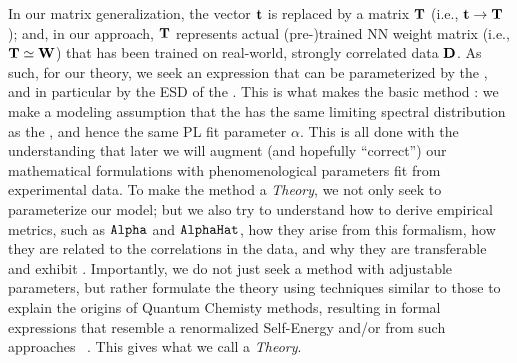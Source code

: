 In our matrix generalization, the \Teacher vector ${\mathbf{t}}$ is replaced by a \Teacher matrix ${\mathbf{T}}$ (i.e., ${\mathbf{t}}\rightarrow{\mathbf{T}}$); 
and, in our \SETOL approach, ${\mathbf{T}}$ represents actual (pre-)trained NN weight matrix (i.e., ${\mathbf{T}}\simeq{\mathbf{W}}$) that has been trained on real-world, strongly correlated data $\mathbf{D}$.
As such, for our \SETOL theory, we seek an expression that can be parameterized by the \Teacher, and in particular by the ESD of the \Teacher.
This is what makes the basic method \SemiEmpirical: 
we make a modeling assumption that the \Teacher has the same limiting spectral distribution as the \Student, 
and hence the same PL fit parameter $\alpha$. 
This is all done with the understanding that later we will augment
(and hopefully ``correct'') our mathematical formulations with 
phenomenological parameters fit from experimental data.
To make the \SemiEmpirical method a \SemiEmpirical \emph{Theory}, 
we not only seek to parameterize our model; but we also try to understand 
how to derive \HTSR empirical metrics, such as $\texttt{Alpha}$ and $\texttt{AlphaHat}$,
how they arise from this formalism, 
how they are related to the correlations in the data, and 
why they are transferable and exhibit \Universality.
Importantly, we do not just seek a method with adjustable parameters, but rather formulate the theory using
techniques similar to those to explain the origins of Quantum Chemisty \SemiEmpirical methods, resulting in formal
expressions that resemble a renormalized Self-Energy
and/or \EffectiveHamiltonian from such approaches
~\cite{Martin1994,Martin1996_CPL,MartinFreed1996, Brandow1965, freed1977, Freed1983, PhysRevLett.69.800}.
This gives what we call a \SemiEmpirical \emph{Theory}.
